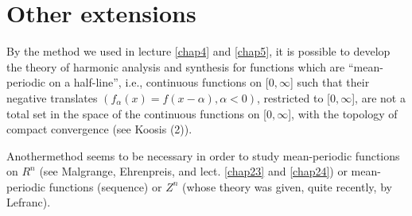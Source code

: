 \section{Other extensions}\label{chap5:sec4}%

By the method we used in lecture \ref{chap4} and \ref{chap5}, it is possible to
develop the theory of harmonic analysis and synthesis for functions
which are ``mean-periodic on a half-line'', i.e., continuous functions
on [$0, \infty$] such that their negative translates $(f_\alpha (x) =
f (x - \alpha), \alpha < 0)$, restricted to [$0, \infty$], are not a
total set in the space of the continuous functions on [$0, \infty$],
with the topology of compact convergence (see Koosis (2)). 

Another\pageoriginale method seems to be necessary in order to study mean-periodic
functions on $R^n$ (see Malgrange, Ehrenpreis, and lect. \ref{chap23}
and \ref{chap24}) 
or mean-periodic functions (sequence) or $Z^n$ (whose theory was
given, quite recently, by Lefranc). 
